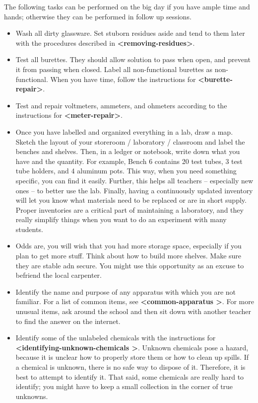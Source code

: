 \documentclass{report}
\begin{document}
The following tasks can be performed on the big day if you have ample time and hands; otherwise they can be performed in follow up sessions.

\begin{itemize}
\item{Wash all dirty glassware. Set stuborn residues aside and tend to them later with the procedures described in \textbf{\textless removing-residues\textgreater }.}
\item{Test all burettes. They should allow solution to pass when open, and prevent it from passing when closed. Label all non-functional burettes as non-functional. When you have time, follow the instructions for \textbf{\textless burette-repair\textgreater }.}
\item{Test and repair voltmeters, ammeters, and ohmeters according to the instructions for \textbf{\textless meter-repair\textgreater }.}
\item{Once you have labelled and organized everything in a lab, draw a map. Sketch the layout of your storeroom / laboratory / classroom and label the benches and shelves. Then, in a ledger or notebook, 
write down what you have and the quantity. For example, Bench 6 contains 20 test tubes, 3 test tube holders, and 4 aluminum pots. This way, when you need something specific, you can find it easily. Further, 
this helps all teachers -- especially new ones -- to better use the lab. Finally, having a continuously updated inventory will let you know what materials need to be replaced or are in short supply. Proper inventories are a critical part of maintaining a laboratory, and they really simplify things when you want to do an experiment with many students.}
\item{Odds are, you will wish that you had more storage space, especially if you plan to get more stuff. Think about how to build more shelves. Make sure they are stable adn secure. You might use this opportunity as an excuse to befriend the local carpenter.}
\item{Identify the name and purpose of any apparatus with which you are not familiar. For a list of common items, see \textbf{\textless common-apparatus \textgreater}. For more unusual items, ask around the school and then sit down with another teacher to find the answer on the internet.}
\item{Identify some of the unlabeled chemicals with the instructions for \textbf{\textless identifying-unknown-chemicals \textgreater}. Unknown chemicals pose a hazard, because it is unclear how to properly store them or how to clean up spills. If a chemical is unknown, there is no safe way to dispose of it. Therefore, it is best to attempt to identify it. That said, some chemicals are really hard to identify; you might have to keep a small collection in the corner of true unknowns.}
\end{itemize}
\end{document}
